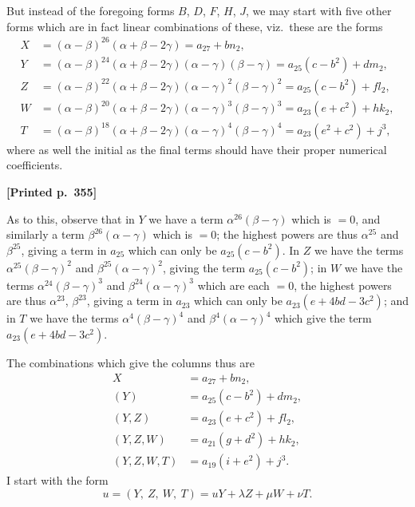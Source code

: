 \documentclass[11pt]{article}
\begin{document}
But instead of the foregoing forms $B$, $D$, $F$, $H$, $J$, we may start with five other forms which are in fact linear combinations of these, viz.\ these are the forms
\begin{align*}
X &= (\alpha - \beta)^{26}(\alpha + \beta - 2\gamma) = a_{27} + bn_{2}, \\
Y &= (\alpha - \beta)^{24}(\alpha + \beta - 2\gamma)(\alpha - \gamma)(\beta - \gamma) = a_{25}(c - b^{2}) + dm_{2}, \\
Z &= (\alpha - \beta)^{22}(\alpha + \beta - 2\gamma)(\alpha - \gamma)^{2}(\beta - \gamma)^{2} = a_{25}(c - b^{2}) + fl_{2}, \\
W &= (\alpha - \beta)^{20}(\alpha + \beta - 2\gamma)(\alpha - \gamma)^{3}(\beta - \gamma)^{3} = a_{23}(e + c^{2}) + hk_{2}, \\
T &= (\alpha - \beta)^{18}(\alpha + \beta - 2\gamma)(\alpha - \gamma)^{4}(\beta - \gamma)^{4} = a_{23}(e^{2} + c^{2}) + j^{3},
\end{align*}
where as well the initial as the final terms should have their proper numerical coefficients.

\medskip

\noindent\textbf{[Printed p.~355]}\hfill

As to this, observe that in $Y$ we have a term $\alpha^{26}(\beta - \gamma)$ which is $= 0$, and similarly a term $\beta^{26}(\alpha - \gamma)$ which is $= 0$; the highest powers are thus $\alpha^{25}$ and $\beta^{25}$, giving a term in $a_{25}$ which can only be $a_{25}(c - b^{2})$. In $Z$ we have the terms $\alpha^{25}(\beta - \gamma)^{2}$ and $\beta^{25}(\alpha - \gamma)^{2}$, giving the term $a_{25}(c - b^{2})$; in $W$ we have the terms $\alpha^{24}(\beta - \gamma)^{3}$ and $\beta^{24}(\alpha - \gamma)^{3}$ which are each $= 0$, the highest powers are thus $\alpha^{23}$, $\beta^{23}$, giving a term in $a_{23}$ which can only be $a_{23}(e + 4bd - 3c^{2})$; and in $T$ we have the terms $\alpha^{4}(\beta - \gamma)^{4}$ and $\beta^{4}(\alpha - \gamma)^{4}$ which give the term $a_{23}(e + 4bd - 3c^{2})$.

The combinations which give the columns thus are
\begin{align*}
X &= a_{27} + bn_{2}, \\
(Y) &= a_{25}(c - b^{2}) + dm_{2}, \\
(Y, Z) &= a_{23}(e + c^{2}) + fl_{2}, \\
(Y, Z, W) &= a_{21}(g + d^{2}) + hk_{2}, \\
(Y, Z, W, T) &= a_{19}(i + e^{2}) + j^{3}.
\end{align*}
I start with the form
\[
u = (Y,\ Z,\ W,\ T) = uY + \lambda Z + \mu W + \nu T.
\]
\end{document}
